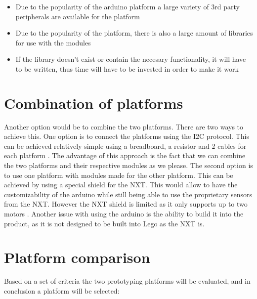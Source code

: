 \begin{itemize}
	\item Due to the popularity of the arduino platform a large variety of 3rd
	party peripherals are available for the platform \Source
	\item Due to the popularity of the platform, there is also a large amount of
	libraries for use with the modules \Source
	\item If the library doesn't exist or contain the necesary functionality, it
	will have to be written, thus time will have to be invested in order to make
	it work
\end{itemize}

\section{Combination of platforms}
Another option would be to combine the two platforms. There are two ways to achieve this.
One option is to connect the platforms using the I2C protocol. This can be achieved relatively
simple using a breadboard, a resistor and 2 cables for each platform \Source. The
advantage of this approach is the fact that we can combine the two platforms and their respective modules as we please.
The second option is to use one platform with modules made for the other platform.
This can be achieved by using a special shield for the NXT. This would allow to
have the customizability of the arduino while still being able to use the proprietary sensors from the NXT. 
However the NXT shield is limited as it only supports up to two motors \Source.
Another issue with using the arduino is the ability to build it into the product, as it is not
designed to be built into Lego as the NXT is.\nl

\section{Platform comparison}
Based on a set of criteria the two prototyping platforms will be evaluated, and
in conclusion a platform will be selected:

